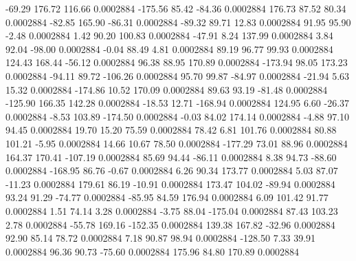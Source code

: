       -69.29      176.72      116.66     0.0002884
     -175.56       85.42      -84.36     0.0002884
      176.73       87.52       80.34     0.0002884
      -82.85      165.90      -86.31     0.0002884
      -89.32       89.71       12.83     0.0002884
       91.95       95.90       -2.48     0.0002884
        1.42       90.20      100.83     0.0002884
      -47.91        8.24      137.99     0.0002884
        3.84       92.04      -98.00     0.0002884
       -0.04       88.49        4.81     0.0002884
       89.19       96.77       99.93     0.0002884
      124.43      168.44      -56.12     0.0002884
       96.38       88.95      170.89     0.0002884
     -173.94       98.05      173.23     0.0002884
      -94.11       89.72     -106.26     0.0002884
       95.70       99.87      -84.97     0.0002884
      -21.94        5.63       15.32     0.0002884
     -174.86       10.52      170.09     0.0002884
       89.63       93.19      -81.48     0.0002884
     -125.90      166.35      142.28     0.0002884
      -18.53       12.71     -168.94     0.0002884
      124.95        6.60      -26.37     0.0002884
       -8.53      103.89     -174.50     0.0002884
       -0.03       84.02      174.14     0.0002884
       -4.88       97.10       94.45     0.0002884
       19.70       15.20       75.59     0.0002884
       78.42        6.81      101.76     0.0002884
       80.88      101.21       -5.95     0.0002884
       14.66       10.67       78.50     0.0002884
     -177.29       73.01       88.96     0.0002884
      164.37      170.41     -107.19     0.0002884
       85.69       94.44      -86.11     0.0002884
        8.38       94.73      -88.60     0.0002884
     -168.95       86.76       -0.67     0.0002884
        6.26       90.34      173.77     0.0002884
        5.03       87.07      -11.23     0.0002884
      179.61       86.19      -10.91     0.0002884
      173.47      104.02      -89.94     0.0002884
       93.24       91.29      -74.77     0.0002884
      -85.95       84.59      176.94     0.0002884
        6.09      101.42       91.77     0.0002884
        1.51       74.14        3.28     0.0002884
       -3.75       88.04     -175.04     0.0002884
       87.43      103.23        2.78     0.0002884
      -55.78      169.16     -152.35     0.0002884
      139.38      167.82      -32.96     0.0002884
       92.90       85.14       78.72     0.0002884
        7.18       90.87       98.94     0.0002884
     -128.50        7.33       39.91     0.0002884
       96.36       90.73      -75.60     0.0002884
      175.96       84.80      170.89     0.0002884
